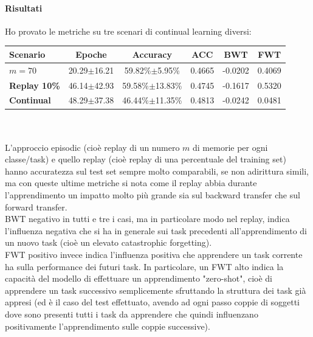 \documentclass[11pt, a4paper, twoside, openright]{book}
\begin{document}
\paragraph{Risultati} Ho provato le metriche su tre scenari di continual learning diversi:
\begin{tabular}{l|c|c|c|c|c}
    \textbf{Scenario} & \textbf{Epoche} & \textbf{Accuracy} & \textbf{ACC} & \textbf{BWT} & \textbf{FWT} \\
    \hline 
    \textbf{$m = 70$} & 20.29$\pm$16.21 & 59.82\%$\pm$5.95\% & 0.4665 & -0.0202 & 0.4069 \\
    \textbf{Replay 10\%} & 46.14$\pm$42.93 & 59.58\%$\pm$13.83\% & 0.4745 & -0.1617 & 0.5320\\
    \textbf{Continual} & 48.29$\pm$37.38 & 46.44\%$\pm$11.35\% & 0.4813 & -0.0242 & 0.0481\\
\end{tabular}\\\\
L'approccio episodic (cioè replay di un numero $m$ di memorie per ogni classe/task) e quello replay (cioè replay di una percentuale del training set) hanno accuratezza sul test set sempre molto comparabili, se non adirittura simili, ma con queste ultime metriche si nota come il replay abbia durante l'apprendimento un impatto molto più grande sia sul backward transfer che sul forward transfer.\\
BWT negativo in tutti e tre i casi, ma in particolare modo nel replay, indica l'influenza negativa che si ha in generale sui task precedenti all'apprendimento di un nuovo task (cioè un elevato catastrophic forgetting).\\
FWT positivo invece indica l'influenza positiva che apprendere un task corrente ha sulla performance dei futuri task. In particolare, un FWT alto indica la capacità del modello di effettuare un apprendimento "zero-shot", cioè di apprendere un task successivo semplicemente sfruttando la struttura dei task già appresi (ed è il caso del test effettuato, avendo ad ogni passo coppie di soggetti dove sono presenti tutti i task da apprendere che quindi influenzano positivamente l'apprendimento sulle coppie successive).\\
\end{document}
